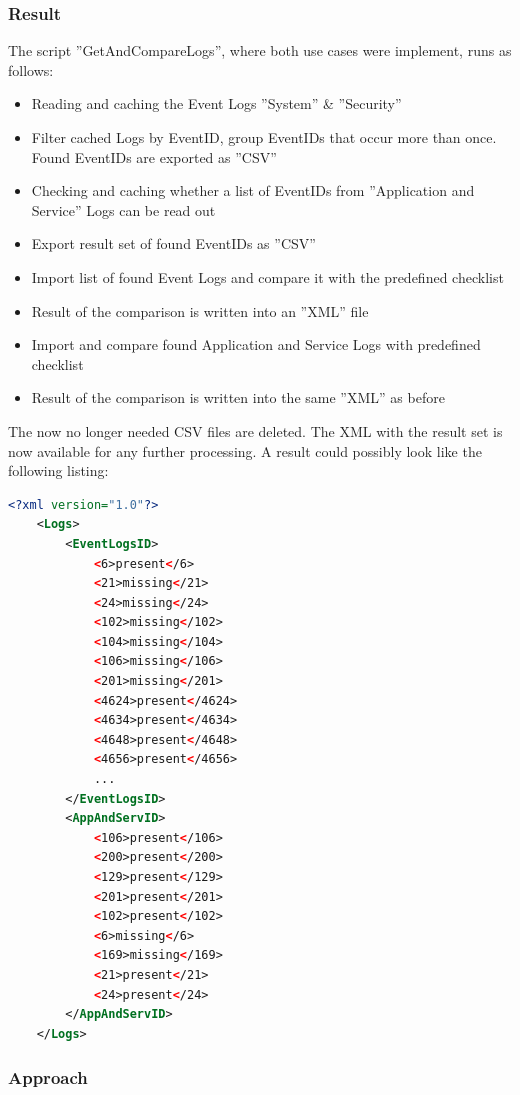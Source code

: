 \subsubsection{Result} \label{ResultSetGetAndCompareLogs}
The script ''GetAndCompareLogs'', where both use cases were implement, runs as follows:
\begin{itemize}
    \item Reading and caching the Event Logs ''System'' \& ''Security''
    \item Filter cached Logs by EventID, group EventIDs that occur more than once. Found EventIDs are exported as ''CSV''
    \item Checking and caching whether a list of EventIDs from ''Application and Service'' Logs can be read out
    \item Export result set of found EventIDs as ''CSV''
    \item Import list of found Event Logs and compare it with the predefined checklist
    \item Result of the comparison is written into an ''XML'' file
    \item Import and compare found Application and Service Logs with predefined checklist
    \item Result of the comparison is written into the same ''XML'' as before
\end{itemize}
The now no longer needed CSV files are deleted. The XML with the result set is now available for any further processing.  A result could possibly look like the following listing:
\begin{lstlisting}[caption=Example Result Audit Policy Analysis, language=xml]
    <?xml version="1.0"?>
    <Logs>
        <EventLogsID>
            <6>present</6>
            <21>missing</21>
            <24>missing</24>
            <102>missing</102>
            <104>missing</104>
            <106>missing</106>
            <201>missing</201>
            <4624>present</4624>
            <4634>present</4634>
            <4648>present</4648>
            <4656>present</4656>
            ...
        </EventLogsID>
        <AppAndServID>
            <106>present</106>
            <200>present</200>
            <129>present</129>
            <201>present</201>
            <102>present</102>
            <6>missing</6>
            <169>missing</169>
            <21>present</21>
            <24>present</24>
        </AppAndServID>
    </Logs>
\end{lstlisting}


\subsubsection{Approach}

